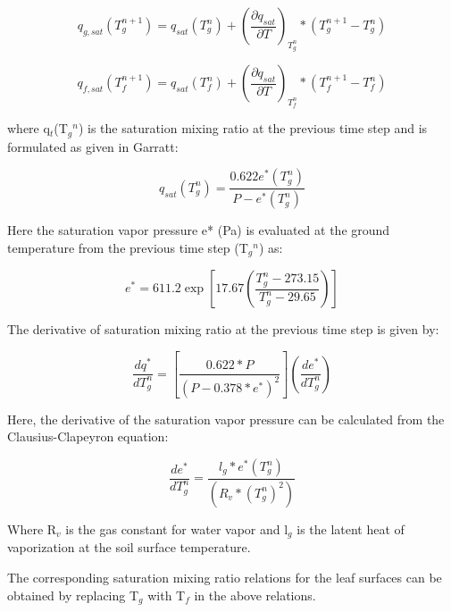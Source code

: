 \begin{equation}
{q_{g,sat}}\left( {T_g^{n + 1}} \right) = {q_{sat}}\left( {T_g^n} \right) + {\left( {\frac{{\partial {q_{sat}}}}{{\partial T}}} \right)_{T_g^n}} * \left( {T_g^{n + 1} - T_g^n} \right)
\end{equation}

\begin{equation}
{q_{f,sat}}\left( {T_f^{n + 1}} \right) = {q_{sat}}\left( {T_f^n} \right) + {\left( {\frac{{\partial {q_{sat}}}}{{\partial T}}} \right)_{T_f^n}} * \left( {T_f^{n + 1} - T_f^n} \right)
\end{equation}

where q\(_{t}\)(T\(_{g}\)\(^{n}\)) is the saturation mixing ratio at the previous time step and is formulated as given in Garratt:

\begin{equation}
{q_{sat}}\left( {T_g^n} \right) = \frac{{0.622{e^ * }\left( {T_g^n} \right)}}{{P - {e^ * }\left( {T_g^n} \right)}}
\end{equation}

Here the saturation vapor pressure e* (Pa) is evaluated at the ground temperature from the previous time step (T\(_{g}\)\(^{n}\)) as:

\begin{equation}
{e^*} = 611.2\exp \left[ {17.67\left( {\frac{{T_g^n - 273.15}}{{T_g^n - 29.65}}} \right)} \right]
\end{equation}

The derivative of saturation mixing ratio at the previous time step is given by:

\begin{equation}
\frac{{d{q^ * }}}{{dT_g^n}} = \left[ {\frac{{0.622 * P}}{{{{\left( {P - 0.378 * {e^ * }} \right)}^2}}}} \right]\left( {\frac{{d{e^ * }}}{{dT_g^n}}} \right)
\end{equation}

Here, the derivative of the saturation vapor pressure can be calculated from the Clausius-Clapeyron equation:

\begin{equation}
\frac{{d{e^ * }}}{{dT_g^n}} = \frac{{{l_g} * {e^ * }\left( {T_g^n} \right)}}{{\left( {{R_v} * {{\left( {T_g^n} \right)}^2}} \right)}}
\end{equation}

Where R\(_{v}\) is the gas constant for water vapor and l\(_{g}\) is the latent heat of vaporization at the soil surface temperature.

The corresponding saturation mixing ratio relations for the leaf surfaces can be obtained by replacing T\(_{g}\) with T\(_{f}\) in the above relations.

